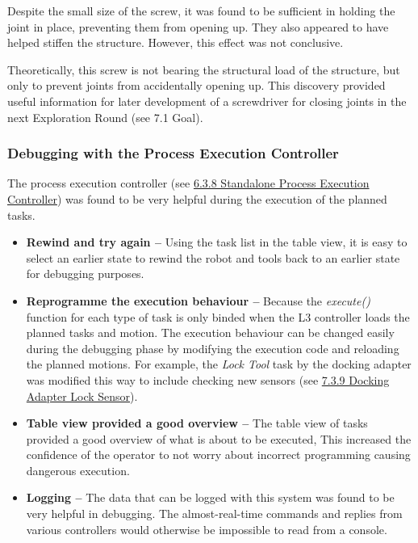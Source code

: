 {Despite the small size of the screw, it was found to be sufficient in holding the joint in place, preventing them from opening up. They also appeared to have helped stiffen the structure. However, this effect was not conclusive.

Theoretically, this screw is not bearing the structural load of the structure, but only to prevent joints from accidentally opening up. This discovery provided useful information for later development of a screwdriver for closing joints in the next Exploration Round (see 7.1 Goal). 

\subsubsection{Debugging with the Process Execution Controller}
\label{subsubsection:exploration_3_debugging_with_the_process_execution_controller}

The process execution controller (see \ul{6.3.8 Standalone Process Execution Controller}) was found to be very helpful during the execution of the planned tasks. 

\begin{itemize}
	\item \textbf{Rewind and try again --} Using the task list in the table view, it is easy to select an earlier state to rewind the robot and tools back to an earlier state for debugging purposes.

	\item \textbf{Reprogramme the execution behaviour --} Because the \textit{execute() }function for each type of task is only binded when the L3 controller loads the planned tasks and motion. The execution behaviour can be changed easily during the debugging phase by modifying the execution code and reloading the planned motions. For example, the \textit{Lock Tool }task by the docking adapter was modified this way to include checking new sensors (see \ul{7.3.9 Docking Adapter Lock Sensor}).

	\item \textbf{Table view provided a good overview --} The table view of tasks provided a good overview of what is about to be executed, This increased the confidence of the operator to not worry about incorrect programming causing dangerous execution.

	\item \textbf{Logging --} The data that can be logged with this system was found to be very helpful in debugging. The almost-real-time commands and replies from various controllers would otherwise be impossible to read from a console.


\end{itemize}}

